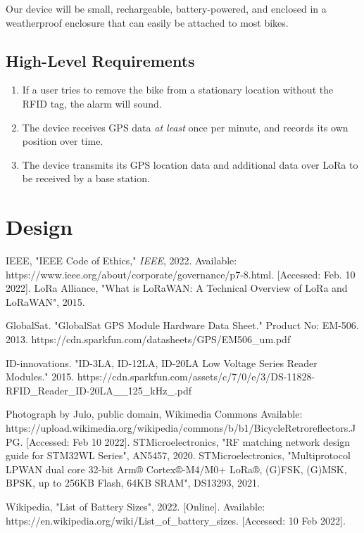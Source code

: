 \documentclass{article}
\begin{document}
Our device will be small, rechargeable, battery-powered, and enclosed in a weatherproof enclosure that can easily be attached to most bikes.
\subsection{High-Level Requirements}

\begin{enumerate}
	\item If a user tries to remove the bike from a stationary location without the RFID tag, the alarm will sound. 
	
	\item The device receives GPS data \textit{at least} once per minute, and records its own position over time.  
	
	\item The device transmits its GPS location data and additional data over LoRa to be received by a base station. 
	
\end{enumerate}

\section{Design}


\begin{thebibliography}{}
	 IEEE, "IEEE Code of Ethics," \textit{IEEE}, 2022. Available: https://www.ieee.org/about/corporate/governance/p7-8.html. [Accessed: Feb. 10 2022].
	 LoRa Alliance, "What is LoRaWAN: A Technical Overview of LoRa and LoRaWAN", 2015.
	
	 GlobalSat. "GlobalSat GPS Module Hardware Data Sheet." Product No: EM-506. 2013. https://cdn.sparkfun.com/datasheets/GPS/EM506\_um.pdf
	
	 ID-innovations. "ID-3LA, ID-12LA, ID-20LA Low Voltage Series Reader Modules." 2015. https://cdn.sparkfun.com/assets/c/7/0/e/3/DS-11828-RFID\_Reader\_ID-20LA\_\_125\_kHz\_.pdf
	
	 Photograph by Julo, public domain, Wikimedia Commons Available: https://upload.wikimedia.org/wikipedia/commons/b/b1/BicycleRetroreflectors.JPG. [Accessed: Feb 10 2022]. 
	 STMicroelectronics, "RF matching network design guide for STM32WL Series", AN5457, 2020. 
	 STMicroelectronics, "Multiprotocol LPWAN dual core 32-bit Arm® Cortex®-M4/M0+	LoRa®, (G)FSK, (G)MSK, BPSK, up to 256KB Flash, 64KB SRAM", DS13293, 2021.
	
	
	
	 Wikipedia, "List of Battery Sizes", 2022. [Online]. Available: https://en.wikipedia.org/wiki/List\_of\_battery\_sizes. [Accessed: 10 Feb 2022]. 
	
	
	
\end{thebibliography}
\end{document}
